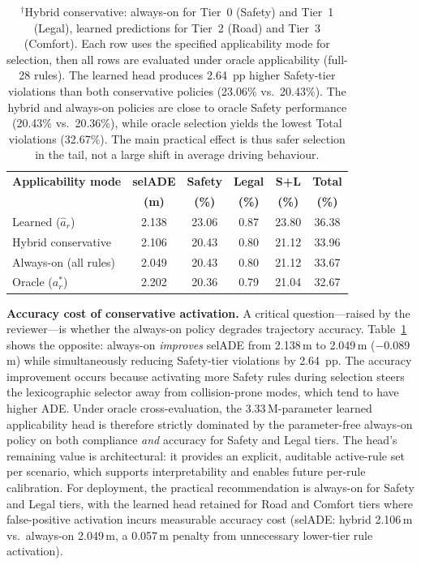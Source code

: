 \begin{table}[t]
\centering
\caption{Conservative Applicability Comparison (Cross-Evaluation: Mode-Specific Selection, Oracle Evaluation, Lexicographic, 43{,}219 Scenarios)}
\label{tab:conservative_applicability}
\setlength{\tabcolsep}{3pt}
\begin{tabular}{lccccc}
\toprule
\textbf{Applicability mode} & \textbf{selADE} & \textbf{Safety} & \textbf{Legal} & \textbf{S+L} & \textbf{Total} \\
 & \textbf{(m)} & \textbf{(\%)} & \textbf{(\%)} & \textbf{(\%)} & \textbf{(\%)} \\
\midrule
Learned ($\hat{a}_r$) & 2.138 & 23.06 & 0.87 & 23.80 & 36.38 \\
Hybrid conservative\rlap{$^{\dagger}$} & 2.106 & 20.43 & 0.80 & 21.12 & 33.96 \\
Always-on (all rules) & 2.049 & 20.43 & 0.80 & 21.12 & 33.67 \\
Oracle ($a_r^*$) & 2.202 & 20.36 & 0.79 & 21.04 & 32.67 \\
\bottomrule
\end{tabular}
\vspace{1mm}
\caption*{\footnotesize $^{\dagger}$Hybrid conservative: always-on for Tier~0 (Safety) and Tier~1 (Legal), learned predictions for Tier~2 (Road) and Tier~3 (Comfort).  Each row uses the specified applicability mode for selection, then all rows are evaluated under oracle applicability (full-28 rules).  The learned head produces 2.64~pp higher Safety-tier violations than both conservative policies (23.06\% vs.\ 20.43\%).  The hybrid and always-on policies are close to oracle Safety performance (20.43\% vs.\ 20.36\%), while oracle selection yields the lowest Total violations (32.67\%).  The main practical effect is thus safer selection in the tail, not a large shift in average driving behaviour.}
\end{table}

\noindent\textbf{Accuracy cost of conservative activation.}  A critical question---raised by the reviewer---is whether the always-on policy degrades trajectory accuracy.  Table~\ref{tab:conservative_applicability} shows the opposite: always-on \emph{improves} selADE from 2.138\,m to 2.049\,m ($-$0.089\,m) while simultaneously reducing Safety-tier violations by 2.64~pp.  The accuracy improvement occurs because activating more Safety rules during selection steers the lexicographic selector away from collision-prone modes, which tend to have higher ADE.  Under oracle cross-evaluation, the 3.33\,M-parameter learned applicability head is therefore strictly dominated by the parameter-free always-on policy on both compliance \emph{and} accuracy for Safety and Legal tiers.  The head's remaining value is architectural: it provides an explicit, auditable active-rule set per scenario, which supports interpretability and enables future per-rule calibration.  For deployment, the practical recommendation is always-on for Safety and Legal tiers, with the learned head retained for Road and Comfort tiers where false-positive activation incurs measurable accuracy cost (selADE: hybrid 2.106\,m vs.\ always-on 2.049\,m, a 0.057\,m penalty from unnecessary lower-tier rule activation).

